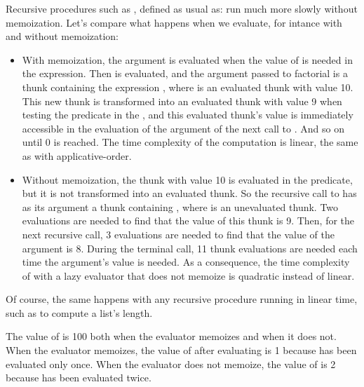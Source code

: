 \begin{exe}[4.29]
    Recursive procedures such as , defined as usual as:
    run much more slowly without memoization. Let’s compare what happens when we 
    evaluate, for intance  with and without memoization:
    \begin{itemize}
	\item With memoization, the argument is evaluated when the value of 
	     is needed in the  expression. Then 
	     is evaluated, and the argument passed to 
	    factorial is a thunk containing the expression , where 
	     is an evaluated thunk with value 10. This new thunk is 
	    transformed into an evaluated thunk with value 9 when testing the 
	    predicate in the , and this evaluated thunk’s value is 
	    immediately accessible in the evaluation of the argument of the next 
	    call to . And so on until 0 is reached. The time 
	    complexity of the computation is linear, the same as with 
	    applicative-order.
	\item Without memoization, the thunk with value 10 is evaluated in the 
	     predicate, but it is not transformed into an evaluated 
	    thunk. So the recursive call to  has as its argument 
	    a thunk containing , where  is an unevaluated 
	    thunk. Two evaluations are needed to find that the value of this 
	    thunk is 9. Then, for the next recursive call, 3 evaluations are 
	    needed to find that the value of the argument is 8. During the 
	    terminal call, 11 thunk evaluations are needed each time the 
	    argument’s value is needed. As a consequence, the time complexity of 
	     with a lazy evaluator that does not memoize is 
	    quadratic instead of linear.
    \end{itemize}
    Of course, the same happens with any recursive procedure running in linear 
    time, such as  to compute a list’s length.

    \medskip

    The value of  is 100 both when the evaluator memoizes 
    and when it does not. When the evaluator memoizes, the value of  
    after evaluating  is 1 because  has 
    been evaluated only once. When the evaluator does not memoize, the value of 
     is 2 because  has been evaluated twice.
\end{exe}

